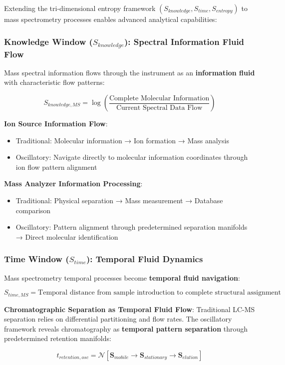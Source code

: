 \documentclass[11pt,a4paper]{article}
\theoremstyle{remark}
\begin{document}
Extending the tri-dimensional entropy framework $(S_{knowledge}, S_{time}, S_{entropy})$ to mass spectrometry processes enables advanced analytical capabilities:

\subsubsection{Knowledge Window ($S_{knowledge}$): Spectral Information Fluid Flow}

Mass spectral information flows through the instrument as an \textbf{information fluid} with characteristic flow patterns:

$$S_{knowledge,MS} = \log\left(\frac{\text{Complete Molecular Information}}{\text{Current Spectral Data Flow}}\right)$$

\textbf{Ion Source Information Flow}:
\begin{itemize}
\item Traditional: Molecular information → Ion formation → Mass analysis
\item Oscillatory: Navigate directly to molecular information coordinates through ion flow pattern alignment
\end{itemize}

\textbf{Mass Analyzer Information Processing}:
\begin{itemize}
\item Traditional: Physical separation → Mass measurement → Database comparison  
\item Oscillatory: Pattern alignment through predetermined separation manifolds → Direct molecular identification
\end{itemize}

\subsubsection{Time Window ($S_{time}$): Temporal Fluid Dynamics}

Mass spectrometry temporal processes become \textbf{temporal fluid navigation}:

$$S_{time,MS} = \text{Temporal distance from sample introduction to complete structural assignment}$$

\textbf{Chromatographic Separation as Temporal Fluid Flow}:
Traditional LC-MS separation relies on differential partitioning and flow rates. The oscillatory framework reveals chromatography as \textbf{temporal pattern separation} through predetermined retention manifolds:

$$t_{retention,osc} = \mathcal{N}[\mathbf{S}_{mobile} \rightarrow \mathbf{S}_{stationary} \rightarrow \mathbf{S}_{elution}]$$
\end{document}

